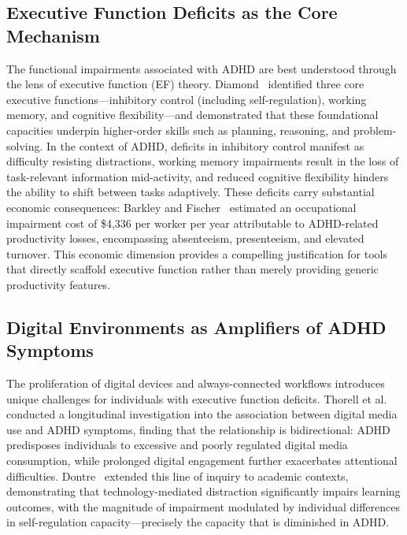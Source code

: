 \subsection{Executive Function Deficits as the Core Mechanism}
\label{sec:litrev_ef_deficits}

The functional impairments associated with ADHD are best understood through the lens of executive function (EF) theory. Diamond~\cite{diamond2013} identified three core executive functions---inhibitory control (including self-regulation), working memory, and cognitive flexibility---and demonstrated that these foundational capacities underpin higher-order skills such as planning, reasoning, and problem-solving. In the context of ADHD, deficits in inhibitory control manifest as difficulty resisting distractions, working memory impairments result in the loss of task-relevant information mid-activity, and reduced cognitive flexibility hinders the ability to shift between tasks adaptively. These deficits carry substantial economic consequences: Barkley and Fischer~\cite{barkley2010} estimated an occupational impairment cost of \$4,336 per worker per year attributable to ADHD-related productivity losses, encompassing absenteeism, presenteeism, and elevated turnover. This economic dimension provides a compelling justification for tools that directly scaffold executive function rather than merely providing generic productivity features.

\subsection{Digital Environments as Amplifiers of ADHD Symptoms}
\label{sec:litrev_digital_amplifiers}

The proliferation of digital devices and always-connected workflows introduces unique challenges for individuals with executive function deficits. Thorell et al.~\cite{thorell2022} conducted a longitudinal investigation into the association between digital media use and ADHD symptoms, finding that the relationship is bidirectional: ADHD predisposes individuals to excessive and poorly regulated digital media consumption, while prolonged digital engagement further exacerbates attentional difficulties. Dontre~\cite{dontre2021} extended this line of inquiry to academic contexts, demonstrating that technology-mediated distraction significantly impairs learning outcomes, with the magnitude of impairment modulated by individual differences in self-regulation capacity---precisely the capacity that is diminished in ADHD.

